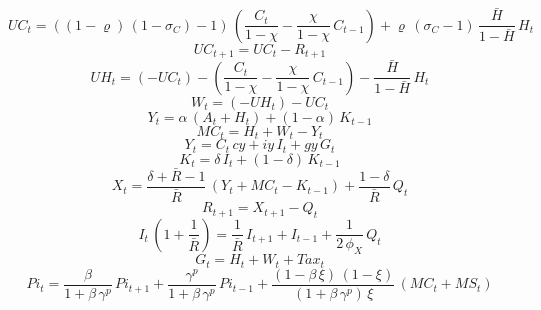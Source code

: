 \begin{dmath}
{UC}_{t}=\left(\left(1-{{\varrho}}\right)\, \left(1-{{\sigma_{C}}}\right)-1\right)\, \left(\frac{{C}_{t}}{1-{{\chi}}}-\frac{{{\chi}}}{1-{{\chi}}}\, {C}_{t-1}\right)+{{\varrho}}\, \left({{\sigma_{C}}}-1\right)\, \frac{{{\bar{H}}}}{1-{{\bar{H}}}}\, {H}_{t}
\end{dmath}
\begin{dmath}
{UC}_{t+1}={UC}_{t}-{R}_{t+1}
\end{dmath}
\begin{dmath}
{UH}_{t}=\left(-{UC}_{t}\right)-\left(\frac{{C}_{t}}{1-{{\chi}}}-\frac{{{\chi}}}{1-{{\chi}}}\, {C}_{t-1}\right)-\frac{{{\bar{H}}}}{1-{{\bar{H}}}}\, {H}_{t}
\end{dmath}
\begin{dmath}
{W}_{t}=\left(-{UH}_{t}\right)-{UC}_{t}
\end{dmath}
\begin{dmath}
{Y}_{t}={{\alpha}}\, \left({A}_{t}+{H}_{t}\right)+\left(1-{{\alpha}}\right)\, {K}_{t-1}
\end{dmath}
\begin{dmath}
{MC}_{t}={H}_{t}+{W}_{t}-{Y}_{t}
\end{dmath}
\begin{dmath}
{Y}_{t}={C}_{t}\, {{cy}}+{{iy}}\, {I}_{t}+{{gy}}\, {G}_{t}
\end{dmath}
\begin{dmath}
{K}_{t}={{\delta}}\, {I}_{t}+\left(1-{{\delta}}\right)\, {K}_{t-1}
\end{dmath}
\begin{dmath}
{X}_{t}=\frac{{{\delta}}+{{\bar{R}}}-1}{{{\bar{R}}}}\, \left({Y}_{t}+{MC}_{t}-{K}_{t-1}\right)+\frac{1-{{\delta}}}{{{\bar{R}}}}\, {Q}_{t}
\end{dmath}
\begin{dmath}
{R}_{t+1}={X}_{t+1}-{Q}_{t}
\end{dmath}
\begin{dmath}
{I}_{t}\, \left(1+\frac{1}{{{\bar{R}}}}\right)=\frac{1}{{{\bar{R}}}}\, {I}_{t+1}+{I}_{t-1}+\frac{1}{2\, {{\phi_{X}}}}\, {Q}_{t}
\end{dmath}
\begin{dmath}
{G}_{t}={H}_{t}+{W}_{t}+{Tax}_{t}
\end{dmath}
\begin{dmath}
{Pi}_{t}=\frac{{{\beta}}}{1+{{\beta}}\, {{\gamma^{p}}}}\, {Pi}_{t+1}+\frac{{{\gamma^{p}}}}{1+{{\beta}}\, {{\gamma^{p}}}}\, {Pi}_{t-1}+\frac{\left(1-{{\beta}}\, {{\xi}}\right)\, \left(1-{{\xi}}\right)}{\left(1+{{\beta}}\, {{\gamma^{p}}}\right)\, {{\xi}}}\, \left({MC}_{t}+{MS}_{t}\right)
\end{dmath}
